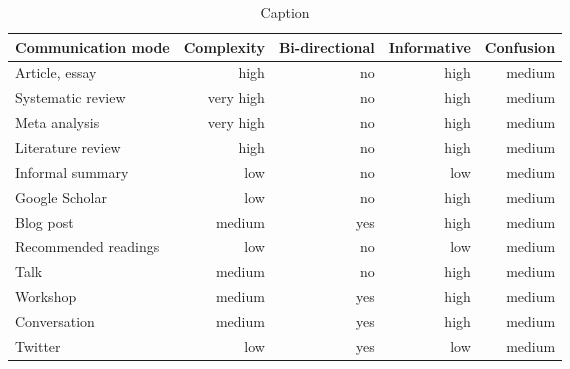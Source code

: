 \begin{table*}\centering
{}
\begin{tabular}{@{}lrrrr@{}}\toprule
Communication mode & Complexity & Bi-directional & Informative  & Confusion
\\\midrule
Article, essay      & high      & no    & high & medium  \\
Systematic review   & very high & no    & high & medium\\
Meta analysis       & very high & no    & high & medium\\
Literature review   & high      & no    & high & medium\\
Informal summary    & low       & no    & low & medium\\
Google Scholar      & low       & no    & high & medium\\
Blog post           & medium    & yes   & high & medium\\
Recommended readings& low       & no    & low & medium\\
Talk                & medium    & no    & high & medium\\
Workshop            & medium    & yes   & high & medium\\
Conversation        & medium    & yes   & high & medium\\
Twitter             & low       & yes   & low & medium\\
\bottomrule
\end{tabular}
\caption{Caption}
\end{table*}